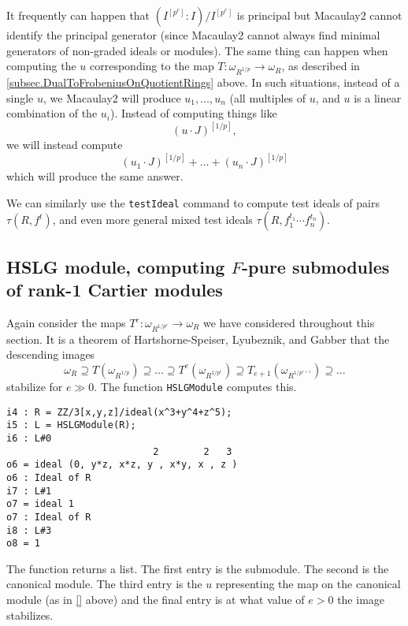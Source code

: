 \documentclass[11pt]{amsart}
\begin{document}
\begin{remark}
It frequently can happen that $(I^{[p^e]} : I)/I^{[p^e]}$ is principal but Macaulay2 cannot identify the principal generator (since Macaulay2 cannot always find minimal generators of non-graded ideals or modules).  The same thing can happen when computing the $u$ corresponding to the map $T : \omega_{R^{1/p}} \to \omega_R$, as described in \autoref{subsec.DualToFrobeniusOnQuotientRings} above.  In such situations, instead of a single $u$, we Macaulay2 will produce $u_1, \dots, u_n$ (all multiples of $u$, and $u$ is a linear combination of the $u_i$).  Instead of computing things like
\[
(u \cdot J)^{[1/p]},
\]
we will instead compute
\[
(u_1 \cdot J)^{[1/p]} + \dots + (u_n \cdot J)^{[1/p]}
\]
which will produce the same answer.
\end{remark}

We can similarly use the {\tt testIdeal} command to compute test ideals of pairs $\tau(R, f^t)$, and even more general mixed test ideals $\tau(R, f_1^{t_1} \cdots f_n^{t_n})$.

\subsection{HSLG module, computing $F$-pure submodules of rank-1 Cartier modules}

Again consider the maps $T^e : \omega_{R^{1/p^e}} \to \omega_R$ we have considered throughout this section.  It is a theorem of Hartshorne-Speiser, Lyubeznik, and Gabber \cite{HartshorneSpeiserLocalCohomologyInCharacteristicP,LyubeznikFModulesApplicationsToLocalCohomology,Gabber.tStruc} that the descending images
\[
\omega_R \supseteq T(\omega_{R^{1/p}}) \supseteq \dots \supseteq T^e(\omega_{R^{1/p^e}}) \supseteq T_{e+1}(\omega_{R^{1/p^{e+1}}}) \supseteq \dots
\]
stabilize for $e \gg 0$.  The function {\tt HSLGModule} computes this.
\begin{verbatim}
i4 : R = ZZ/3[x,y,z]/ideal(x^3+y^4+z^5);
i5 : L = HSLGModule(R);
i6 : L#0
                          2        2   3
o6 = ideal (0, y*z, x*z, y , x*y, x , z )
o6 : Ideal of R
i7 : L#1
o7 = ideal 1
o7 : Ideal of R
i8 : L#3
o8 = 1
\end{verbatim}
The function returns a list.  The first entry is the submodule.  The second is the canonical module.  The third entry is the $u$ representing the map on the canonical module (as in \autoref{} above)
and the final entry is at what value of $e > 0$ the image stabilizes.
\end{document}
